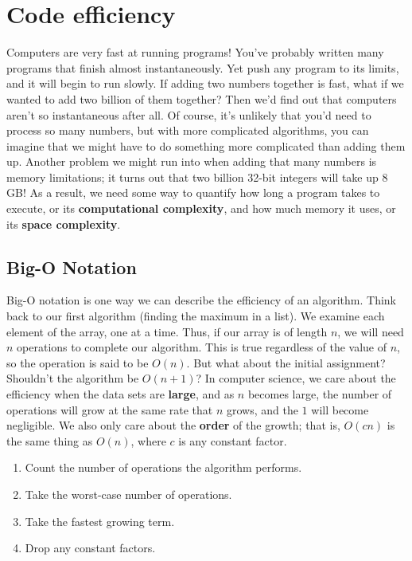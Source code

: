 \section{Code efficiency}

Computers are very fast at running programs! You've probably written many programs that finish almost instantaneously. Yet push any program to its limits, and it will begin to run slowly. If adding two numbers together is fast, what if we wanted to add two billion of them together? Then we'd find out that computers aren't so instantaneous after all. Of course, it's unlikely that you'd need to process so many numbers, but with more complicated algorithms, you can imagine that we might have to do something more complicated than adding them up. Another problem we might run into when adding that many numbers is memory limitations; it turns out that two billion 32-bit integers will take up 8 GB! As a result, we need some way to quantify how long a program takes to execute, or its \textbf{computational complexity}, and how much memory it uses, or its \textbf{space complexity}.


\subsection{Big-O Notation}

Big-O notation is one way we can describe the efficiency of an algorithm.  Think back to our first algorithm (finding the maximum in a list).  We examine each element of the array, one at a time.  Thus, if our array is of length $ n $, we will need $ n $ operations to complete our algorithm.  This is true regardless of the value of $ n $, so the operation is said to be $ O(n) $.  But what about the initial assignment? Shouldn't the algorithm be $ O(n + 1) $?  In computer science, we care about the efficiency when the data sets are \textbf{large}, and as $ n $ becomes large, the number of operations will grow at the same rate that $ n $ grows, and the $ 1 $ will become negligible.  We also only care about the \textbf{order} of the growth; that is, $ O(cn) $ is the same thing as $ O(n) $, where $ c $ is any constant factor.

\begin{enumerate}
    \item Count the number of operations the algorithm performs.
    \item Take the worst-case number of operations.
    \item Take the fastest growing term.
    \item Drop any constant factors.
\end{enumerate}

